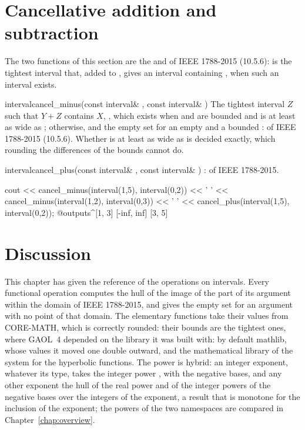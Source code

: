 \section{Cancellative addition and subtraction}
\label{sec:arithmetic-cancellative}
%

The two functions of this section are the  and
 of IEEE 1788-2015 (10.5.6):  is
the tightest interval that, added to , gives an interval containing
, when such an interval exists.

\begin{deffun}{interval}{cancel\_minus}{(const interval\& , const interval\& )}
  The tightest interval $Z$ such that $Y+Z$ contains $X$,
  , which
  exists when  and  are bounded and  is at least as wide
  as ; \itv{-\infty}{+\infty} otherwise, and the empty set for an
  empty  and a bounded :  of IEEE 1788-2015
  (10.5.6). Whether  is at least as wide as  is decided
  exactly, which rounding the differences of the bounds cannot
  do.\newinvfive
\end{deffun}

\begin{deffun}{interval}{cancel\_plus}{(const interval\& , const interval\& )}
  :  of IEEE
  1788-2015.\newinvfive
\begin{example}
cout << cancel_minus(interval(1,5), interval(0,2)) << ' '
     << cancel_minus(interval(1,2), interval(0,3)) << ' '
     << cancel_plus(interval(1,5), interval(0,2));
@outputs^[1, 3] [-inf, inf] [3, 5]~
\end{example}
\end{deffun}

\section{Discussion}\label{sec:arithmetic-discussion}

This chapter has given the reference of the operations on intervals. Every
functional operation computes the hull of the image of the part of its
argument within the domain of IEEE 1788-2015, and gives the empty set for an
argument with no point of that domain. The elementary functions take their
values from CORE-MATH, which is correctly rounded: their bounds are the
tightest ones, where GAOL~4 depended on the library it was built with: by
default mathlib, whose values it moved one double outward, and the
mathematical library of the system for the hyperbolic functions. The power
is hybrid: an integer
exponent, whatever its type, takes the integer power , with the
negative bases, and any other exponent the hull of the real power
 and of the integer powers of the negative bases over the integers of
the exponent, a result that is monotone for the inclusion of the exponent;
the powers of the two namespaces are compared in Chapter~\ref{chap:overview}.

